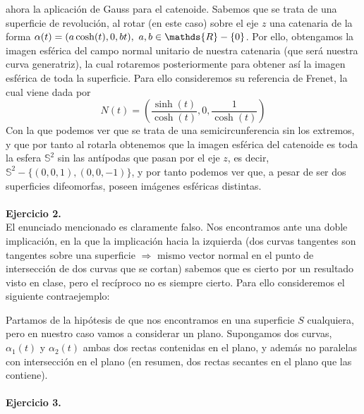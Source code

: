 \documentclass[fleqn]{article}
\def\R{\mathds{R}}
\begin{document}
    ahora la aplicación de Gauss para el catenoide. Sabemos que se trata de una superficie de revolución, al rotar (en este caso) sobre el eje $z$ una catenaria de la forma
    $\alpha(t) = (a\cosh(t), 0, bt), \thinspace \thinspace a,b\in \R-\{0\}$. Por ello, obtengamos la imagen esférica del campo normal unitario de nuestra catenaria (que será nuestra curva generatriz),
    la cual rotaremos posteriormente para obtener así la imagen esférica de toda la superficie. Para ello consideremos su referencia de Frenet, la cual viene dada por
    $$N(t) = \left(\frac{\sinh(t)}{\cosh(t)}, 0, \frac{1}{\cosh(t)} \right)$$
    Con la que podemos ver que se trata de una semicircunferencia sin los extremos, y que por tanto al rotarla obtenemos
    que la imagen esférica del catenoide es toda la esfera $\mathds{S}^2$ sin las antípodas que pasan por el eje $z$, es decir, $\mathds{S}^2 - \{(0,0,1), (0,0,-1)\}$, y por tanto podemos ver que,
    a pesar de ser dos superficies difeomorfas, poseen imágenes esféricas distintas.\\ \\

    \textbf{Ejercicio 2. } \\

    El enunciado mencionado es claramente falso. Nos encontramos ante una doble implicación, en la que la implicación hacia la izquierda (dos curvas tangentes son tangentes sobre 
    una superficie $\Rightarrow$ mismo vector normal en el punto de intersección de dos curvas que se cortan) sabemos que es cierto por un resultado visto en clase, pero el recíproco 
    no es siempre cierto. Para ello consideremos el siguiente contraejemplo:

    Partamos de la hipótesis de que nos encontramos en una superficie $S$ cualquiera, pero en nuestro caso vamos a considerar un plano. Supongamos dos curvas, $\alpha_1(t)$ y $\alpha_2(t)$
    ambas dos rectas contenidas en el plano, y además no paralelas con intersección en el plano (en resumen, dos rectas secantes en el plano que las contiene). 
    \\ \\

    \textbf{Ejercicio 3. } \\
\end{document}

